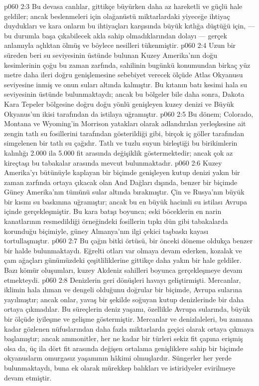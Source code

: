 \vs p060 2:3 Bu devasa canlılar, gittikçe büyürken daha az hareketli ve güçlü hale geldiler; ancak beslenmeleri için olağanüstü miktarlardaki yiyeceğe ihtiyaç duydukları ve kara onların bu ihtiyaçları karşısında büyük kıtlığa düştüğü için, ---bu durumla başa çıkabilecek akla sahip olmadıklarından dolayı --- gerçek anlamıyla açlıktan ölmüş ve böylece nesilleri tükenmiştir.
\vs p060 2:4 Uzun bir süreden beri su seviyesinin üstünde bulunan Kuzey Amerika’nın doğu kesimlerinin çoğu bu zaman zarfında, sahilinin bugünkü konumundan birkaç yüz metre daha ileri doğru genişlemesine sebebiyet verecek ölçüde Atlas Okyanusu seviyesine inmiş ve onun suları altında kalmıştır. Bu kıtanın batı kesimi hala su seviyesinin üstünde bulunmaktaydı; ancak bu bölgeler bile daha sonra, Dakota Kara Tepeler bölgesine doğru doğu yönlü genişleyen kuzey denizi ve Büyük Okyanus’un ikisi tarafından da istilaya uğramıştır.
\vs p060 2:5 Bu dönem; Colorado, Montana ve Wyoming’in Morrison yatakları olarak adlandırılan yerleşkesine ait zengin tatlı su fosillerini tarafından gösterildiği gibi, birçok iç göller tarafından simgelenen bir tatlı su çağıdır. Tatlı ve tuzlu suyun birleştiği bu birikimlerin kalınlığı 2.000 ila 5.000 fit arasında değişiklik göstermektedir; ancak çok az kireçtaşı bu tabakalar arasında mevcut bulunmaktadır.
\vs p060 2:6 Kuzey Amerika’yı bütünüyle kaplayan bir biçimde genişleyen kutup denizi yakın bir zaman zarfında ortaya çıkacak olan And Dağları dışında, benzer bir biçimde Güney Amerika’nın tümünü sular altında bırakmıştır. Çin ve Rusya’nın büyük bir kısmı su baskınına uğramıştır; ancak bu en büyük hacimli su istilası Avrupa içinde gerçekleşmiştir. Bu kara batışı boyunca; eski böceklerin en narin kanatlarının resmedildiği örneğindeki fosillerin tıpkı dün gibi tabakalarda korunduğu biçimiyle, güney Almanya’nın ilgi çekici taşbaskı kayası tortullaşmıştır.
\vs p060 2:7 Bu çağın bitki örtüsü, bir önceki döneme oldukça benzer bir halde bulunmaktaydı. Eğrelti otları var olmaya devam ederken, kozalak ve çam ağaçları günümüzdeki çeşitliliklerine gittikçe daha yakın bir hale geldiler. Bazı kömür oluşumları, kuzey Akdeniz sahilleri boyunca gerçekleşmeye devam etmekteydi.
\vs p060 2:8 Denizlerin geri dönüşleri havayı geliştirmişti. Mercanlar, iklimin hala ılıman ve dengeli olduğunu doğrular bir biçimde, Avrupa sularına yayılmıştır; ancak onlar, yavaş bir şekilde soğuyan kutup denizlerinde bir daha ortaya çıkmadılar. Bu süreçlerin deniz yaşamı, özellikle Avrupa sularında, büyük bir ölçüde iyileşme ve gelişme göstermiştir. Mercanlar ve denizlaleleri, bu zamana kadar gözlenen nüfuslarından daha fazla miktarlarda geçici olarak ortaya çıkmaya başlamıştır; ancak ammonitler, her ne kadar bir türleri sekiz fit çapına erişmiş olsa da, üç ila dört fit arasında değişen ortalama genişliklere sahip bir biçimde okyanusların omurgasız yaşamının hâkimi olmuşlardır. Süngerler her yerde bulunmaktaydı, buna ek olarak mürekkep balıkları ve istiridyeler evirilmeye devam etmiştir.
